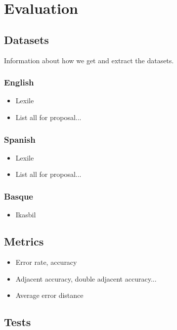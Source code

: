 \documentclass[12pt]{article}
\begin{document}
\section{Evaluation}

\subsection{Datasets}
Information about how we get and extract the datasets.
\subsubsection{English}
\begin{itemize}
\item Lexile
\item List all for proposal...
\end{itemize}
\subsubsection{Spanish}
\begin{itemize}
\item Lexile
\item List all for proposal...
\end{itemize}
\subsubsection{Basque}
\begin{itemize}
\item Ikasbil
\end{itemize}

\subsection{Metrics}

\begin{itemize}
\item Error rate, accuracy
\item Adjacent accuracy, double adjacent accuracy...
\item Average error distance
\end{itemize}

\subsection{Tests}
\end{document}

